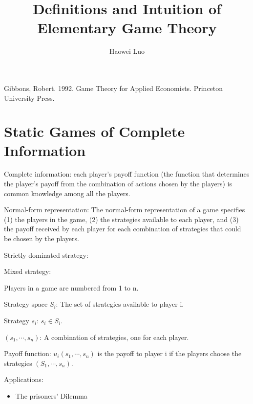 \documentclass{article}
\title{Definitions and Intuition of Elementary Game Theory}
\author{Haowei Luo}
\begin{document}
    \maketitle
    Gibbons, Robert. 1992. Game Theory for Applied Economists. Princeton University Press. 
    \section*{Static Games of Complete Information}
    Complete information: each player's payoff function (the function that determines the player's payoff from the combination of actions chosen by the players) is common knowledge among all the players.

    Normal-form representation: The normal-form representation of a game specifies (1) the players in the game, (2) the strategies available to each player, and (3) the payoff received by each player for each combination of strategies that could be chosen by the players.

    Strictly dominated strategy: 

    Mixed strategy: 

    Players in a game are numbered from 1 to n. 
    
    Strategy space $S_i$: The set of strategies available to player i.

    Strategy $s_i$: $s_i \in S_i$.

    $(s_1, \cdots, s_n)$: A combination of strategies, one for each player.

    Payoff function: $u_i (s_1, \cdots, s_n)$ is the payoff to player i if the players choose the strategies $(S_1, \cdots, s_n)$. 
    
    Applications:
    \begin{itemize}
        \item The prisoners' Dilemma
    \end{itemize}
    
\end{document}
